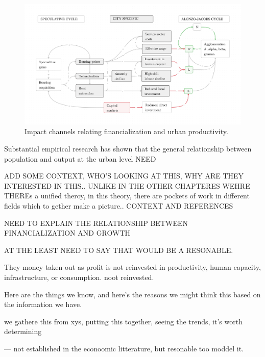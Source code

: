 \begin{figure}[h!tb]\label{fig-impact-channels}
\begin{adjustwidth}{-0.24\textwidth}{-0.24\textwidth}
\centering
\includegraphics[scale=.15 ]{fig/impact-channels.png}%
\end{adjustwidth}
\caption{Impact channels relating financialization and urban productivity.}
\end{figure}



Substantial empirical research has shown that the general relationship  between population and output at the urban level NEED 


ADD SOME CONTEXT, WHO'S LOOKING AT THIS, WHY ARE THEY INTERESTED IN THIS..  UNLIKE IN  THE OTHER CHAPTERES WEHRE THEREs a unified theroy, in this theory, there are pockets of work  in different fields which to gether make a picture.. 
CONTEXT AND REFERENCES 

NEED TO EXPLAIN THE  RELATIONSHIP BETWEEN FINANCIALIZATION AND GROWTH

AT THE LEAST NEED TO SAY THAT WOULD BE A RESONABLE.

They money taken out as profit is not reinvested in productivity, human capacity, infrastructure, or consumption. noot reinvested.

Here are the things we know, and here's the reasons we might think this based on the information we have.

we gathere this from xys, putting this together, seeing the trends, it's worth determining

--- not established in the econoomic litterature, but resonable too moddel it.

